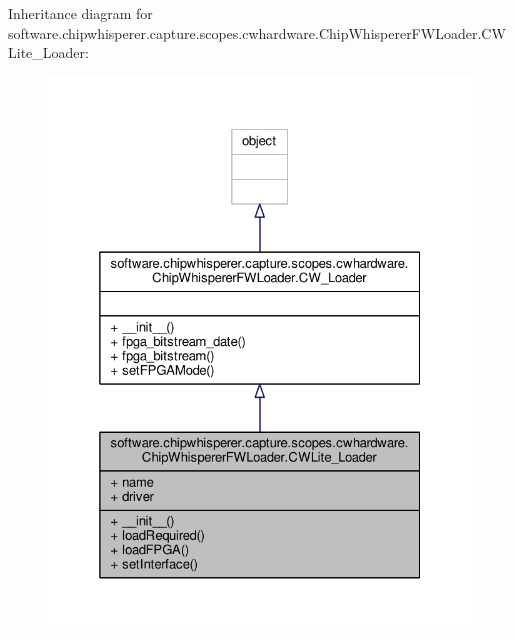 Inheritance diagram for software.\+chipwhisperer.\+capture.\+scopes.\+cwhardware.\+Chip\+Whisperer\+F\+W\+Loader.\+C\+W\+Lite\+\_\+\+Loader\+:\nopagebreak
\begin{figure}[H]
\begin{center}
\leavevmode
\includegraphics[width=325pt]{db/d46/classsoftware_1_1chipwhisperer_1_1capture_1_1scopes_1_1cwhardware_1_1ChipWhispererFWLoader_1_1CWLite__Loader__inherit__graph}
\end{center}
\end{figure}


